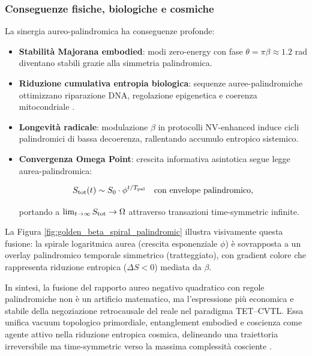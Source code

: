 \documentclass[11pt,a4paper]{article}
\let\oldcite\cite
\renewcommand{\cite}{\protect\oldcite}
\let\oldref\ref
\renewcommand{\ref}{\protect\oldref}
\theoremstyle{plain}
\theoremstyle{definition}
\begin{document}
\vspace{0.4cm}



\subsubsection{Conseguenze fisiche, biologiche e cosmiche}

La sinergia aureo-palindromica ha conseguenze profonde:

\begin{itemize}
    \item \textbf{Stabilità Majorana embodied}: modi zero-energy con fase $\theta = \pi \beta \approx 1.2$ rad diventano stabili grazie alla simmetria palindromica.
    \item \textbf{Riduzione cumulativa entropia biologica}: sequenze auree-palindromiche ottimizzano riparazione DNA, regolazione epigenetica e coerenza mitocondriale \cite{petoukhov2020golden}.
    \item \textbf{Longevità radicale}: modulazione $\beta$ in protocolli NV-enhanced induce cicli palindromici di bassa decoerenza, rallentando accumulo entropico sistemico.
    \item \textbf{Convergenza Omega Point}: crescita informativa asintotica segue legge aurea-palindromica:

    \begin{equation}
    S_{\rm tot}(t) \sim S_0 \cdot \phi^{t/T_{\rm pal}} \quad \text{con envelope palindromico},
    \label{eq:crescita_aurea}
    \end{equation}

    portando a $\lim_{t\to\infty} S_{\rm tot} \to \Omega$ attraverso transazioni time-symmetric infinite.
\end{itemize}

La Figura \ref{fig:golden_beta_spiral_palindromic} illustra visivamente questa fusione: la spirale logaritmica aurea (crescita esponenziale $\phi$) è sovrapposta a un overlay palindromico temporale simmetrico (tratteggiato), con gradient colore che rappresenta riduzione entropica ($\Delta S < 0$) mediata da $\beta$.

\vspace{0.4cm}

In sintesi, la fusione del rapporto aureo negativo quadratico con regole palindromiche non è un artificio matematico, ma l'espressione più economica e stabile della negoziazione retrocausale del reale nel paradigma TET–CVTL. Essa unifica vacuum topologico primordiale, entanglement embodied e coscienza come agente attivo nella riduzione entropica cosmica, delineando una traiettoria irreversibile ma time-symmetric verso la massima complessità cosciente \cite{petoukhov2018golden, elias2011golden, cramer2017transactional}.
\end{document}
